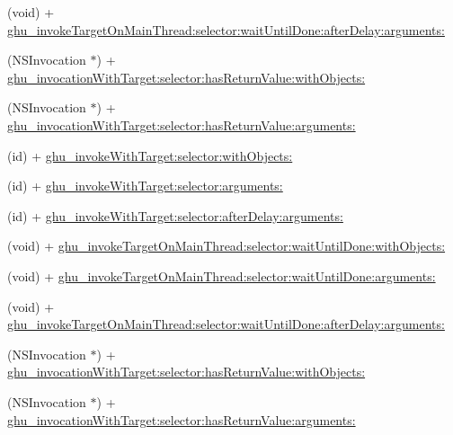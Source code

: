 \begin{DoxyCompactItemize}
\item 
(void) + \hyperlink{interface_n_s_invocation_07_g_h_utils___g_h_u_n_i_t_08_a0b891f27c084f6677907e0f907caf5f9}{ghu\-\_\-invoke\-Target\-On\-Main\-Thread\-:selector\-:wait\-Until\-Done\-:after\-Delay\-:arguments\-:}
\item 
(\-N\-S\-Invocation $\ast$) + \hyperlink{interface_n_s_invocation_07_g_h_utils___g_h_u_n_i_t_08_a31d3598ec7e21face3cb783c2c60b42c}{ghu\-\_\-invocation\-With\-Target\-:selector\-:has\-Return\-Value\-:with\-Objects\-:}
\item 
(\-N\-S\-Invocation $\ast$) + \hyperlink{interface_n_s_invocation_07_g_h_utils___g_h_u_n_i_t_08_a64dcd5d1f117118b02213db0846092d9}{ghu\-\_\-invocation\-With\-Target\-:selector\-:has\-Return\-Value\-:arguments\-:}
\item 
(id) + \hyperlink{interface_n_s_invocation_07_g_h_utils___g_h_u_n_i_t_08_af60de644c62297e237a21adf2ea75e80}{ghu\-\_\-invoke\-With\-Target\-:selector\-:with\-Objects\-:}
\item 
(id) + \hyperlink{interface_n_s_invocation_07_g_h_utils___g_h_u_n_i_t_08_a0aa9a0433b00c60a8174c7bed363821f}{ghu\-\_\-invoke\-With\-Target\-:selector\-:arguments\-:}
\item 
(id) + \hyperlink{interface_n_s_invocation_07_g_h_utils___g_h_u_n_i_t_08_a7f856b1af207762c610e597941411091}{ghu\-\_\-invoke\-With\-Target\-:selector\-:after\-Delay\-:arguments\-:}
\item 
(void) + \hyperlink{interface_n_s_invocation_07_g_h_utils___g_h_u_n_i_t_08_a6933a1f0fd7d0d4b8f133baf53f30a31}{ghu\-\_\-invoke\-Target\-On\-Main\-Thread\-:selector\-:wait\-Until\-Done\-:with\-Objects\-:}
\item 
(void) + \hyperlink{interface_n_s_invocation_07_g_h_utils___g_h_u_n_i_t_08_a261cd5aa6061478716fba4f79cb4f69b}{ghu\-\_\-invoke\-Target\-On\-Main\-Thread\-:selector\-:wait\-Until\-Done\-:arguments\-:}
\item 
(void) + \hyperlink{interface_n_s_invocation_07_g_h_utils___g_h_u_n_i_t_08_a0b891f27c084f6677907e0f907caf5f9}{ghu\-\_\-invoke\-Target\-On\-Main\-Thread\-:selector\-:wait\-Until\-Done\-:after\-Delay\-:arguments\-:}
\item 
(\-N\-S\-Invocation $\ast$) + \hyperlink{interface_n_s_invocation_07_g_h_utils___g_h_u_n_i_t_08_a31d3598ec7e21face3cb783c2c60b42c}{ghu\-\_\-invocation\-With\-Target\-:selector\-:has\-Return\-Value\-:with\-Objects\-:}
\item 
(\-N\-S\-Invocation $\ast$) + \hyperlink{interface_n_s_invocation_07_g_h_utils___g_h_u_n_i_t_08_a64dcd5d1f117118b02213db0846092d9}{ghu\-\_\-invocation\-With\-Target\-:selector\-:has\-Return\-Value\-:arguments\-:}

\end{DoxyCompactItemize}
